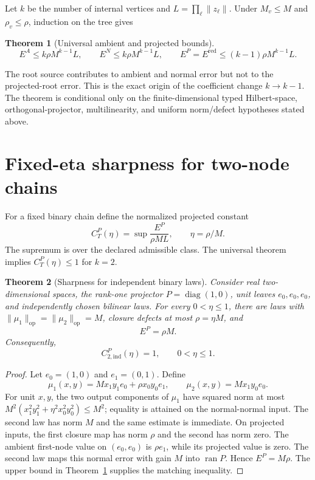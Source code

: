 \documentclass[11pt]{amsart}
\newtheorem{theorem}{Theorem}[section]
\theoremstyle{definition}
\theoremstyle{remark}
\newcommand{\op}{\mathrm{op}}
\newcommand{\norm}[1]{\lVert#1\rVert}
\newcommand{\ran}{\operatorname{ran}}
\begin{document}
Let $k$ be the number of internal vertices and
$L=\prod_\ell\norm{z_\ell}$. Under $M_v\le M$ and $\rho_v\le\rho$,
induction on the tree gives
\begin{theorem}[Universal ambient and projected bounds]
\label{thm:universal}
\[
 E^A\le k\rho M^{k-1}L,\qquad E^N\le k\rho M^{k-1}L,
 \qquad E^P=E^{\mathrm{red}}\le(k-1)\rho M^{k-1}L.
\]
\end{theorem}

The root source contributes to ambient and normal error but not to the
projected-root error. This is the exact origin of the coefficient change
$k\to k-1$. The theorem is conditional only on the finite-dimensional typed
Hilbert-space, orthogonal-projector, multilinearity, and uniform norm/defect
hypotheses stated above.

\section{Fixed-eta sharpness for two-node chains}

For a fixed binary chain define the normalized projected constant
\[
 C_T^P(\eta)=\sup\frac{E^P}{\rho M L},\qquad \eta=\rho/M.
\]
The supremum is over the declared admissible class. The universal theorem
implies $C_T^P(\eta)\le1$ for $k=2$.

\begin{theorem}[Sharpness for independent binary laws]
\label{thm:k2sharp}
Consider real two-dimensional spaces, the rank-one projector
$P=\operatorname{diag}(1,0)$, unit leaves $e_0,e_0,e_0$, and independently
chosen bilinear laws. For every $0<\eta\le1$, there are laws with
$\norm{\mu_1}_\op=\norm{\mu_2}_\op=M$, closure defects at most
$\rho=\eta M$, and
\[
 E^P=\rho M.
\]
Consequently,
\[
 \boxed{C_{2,\mathrm{ind}}^P(\eta)=1},\qquad 0<\eta\le1.
\]
\end{theorem}

\begin{proof}
Let $e_0=(1,0)$ and $e_1=(0,1)$. Define
\[
 \mu_1(x,y)=M x_1y_1e_0+\rho x_0y_0e_1,
 \qquad
 \mu_2(x,y)=M x_1y_0e_0.
\]
For unit $x,y$, the two output components of $\mu_1$ have squared norm at
most $M^2(x_1^2y_1^2+\eta^2x_0^2y_0^2)\le M^2$; equality is attained on
the normal-normal input. The second law has norm $M$ and the same estimate is
immediate. On projected inputs, the first closure map has norm $\rho$ and
the second has norm zero. The ambient first-node value on $(e_0,e_0)$ is
$\rho e_1$, while its projected value is zero. The second law maps this
normal error with gain $M$ into $\ran P$. Hence $E^P=M\rho$. The upper
bound in Theorem~\ref{thm:universal} supplies the matching inequality.
\end{proof}
\end{document}

